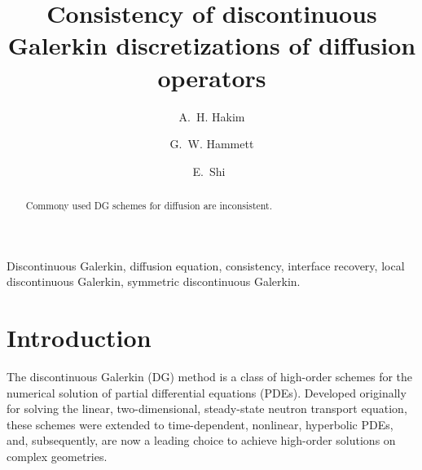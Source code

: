 \documentclass{siamltex}
\title{Consistency of discontinuous Galerkin discretizations of
  diffusion operators}
\author{A.~H. Hakim\footnotemark[2] \and G.~W. Hammett\footnotemark[2]
  \and E.~Shi\footnotemark[2]\ \footnotemark[3]}
\begin{document}
\maketitle

\begin{abstract}
  Commony used DG schemes for diffusion are inconsistent.
\end{abstract}

\begin{keywords} 
  Discontinuous Galerkin, diffusion equation, consistency, interface
  recovery, local discontinuous Galerkin, symmetric discontinuous
  Galerkin.
\end{keywords}

\section{Introduction}

The discontinuous Galerkin (DG) method is a class of high-order
schemes for the numerical solution of partial differential equations
(PDEs). Developed originally for solving the linear, two-dimensional,
steady-state neutron transport equation\cite{reed-hill-1973}, these
schemes were extended to time-dependent, nonlinear, hyperbolic
PDEs\cite{Cockburn:2001vr}, and, subsequently, are now a leading
choice to achieve high-order solutions on complex geometries.
\end{document}
